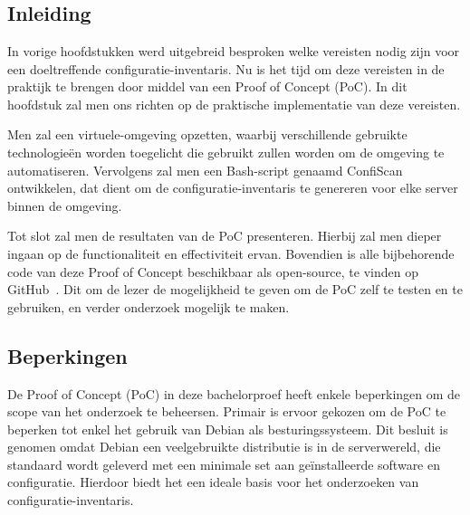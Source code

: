 
\chapter{}
\label{ch:poc}

\section{Inleiding}
\label{poc_inleiding}

In vorige hoofdstukken werd uitgebreid besproken welke vereisten nodig zijn voor een doeltreffende configuratie-inventaris.
Nu is het tijd om deze vereisten in de praktijk te brengen door middel van een Proof of Concept (PoC).
In dit hoofdstuk zal men ons richten op de praktische implementatie van deze vereisten.

Men zal een virtuele-omgeving opzetten, waarbij verschillende gebruikte technologie\"en worden toegelicht die gebruikt zullen worden om de omgeving te automatiseren.
Vervolgens zal men een Bash-script genaamd ConfiScan ontwikkelen, dat dient om de configuratie-inventaris te genereren voor elke server binnen de omgeving.

Tot slot zal men de resultaten van de PoC presenteren.
Hierbij zal men dieper ingaan op de functionaliteit en effectiviteit ervan.
Bovendien is alle bijbehorende code van deze Proof of Concept beschikbaar als open-source, te vinden op GitHub~\autocite{github-poc}.
Dit om de lezer de mogelijkheid te geven om de PoC zelf te testen en te gebruiken, en verder onderzoek mogelijk te maken.

\section{Beperkingen}
\label{poc_beperkingen}

De Proof of Concept (PoC) in deze bachelorproef heeft enkele beperkingen om de scope van het onderzoek te beheersen.
Primair is ervoor gekozen om de PoC te beperken tot enkel het gebruik van Debian als besturingssysteem.
Dit besluit is genomen omdat Debian een veelgebruikte distributie is in de serverwereld, die standaard wordt geleverd met een minimale set aan ge\"installeerde software en configuratie.
Hierdoor biedt het een ideale basis voor het onderzoeken van configuratie-inventaris.

